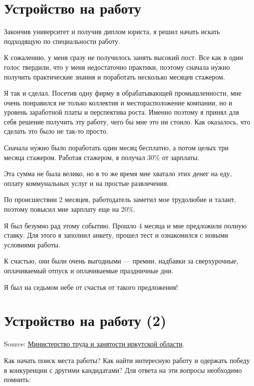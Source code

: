 
\section{Устройство на работу}
Закончив университет и получив диплом юриста, я решил начать искать подходящую по специальности работу.

К сожалению, у меня сразу не получилось занять высокий пост.
Все как в один голос твердили, что у меня недостаточно практики, поэтому сначала н\'{у}жно получить практические знания и поработать несколько месяцев стажером.

Я так и сделал.
Посетив одну фирму в обрабатывающей промышленности, мне очень понравился не только коллектив и месторасположение компании, но и уровень заработной платы и перспектива роста.
Именно поэтому я принял для себя решение получить эту работу, чего бы мне это ни стоило.
Как оказалось, что сделать это было не так-то просто.

Сначала н\'{у}жно было поработать один месяц бесплатно, а потом целых три месяца стажером.
Работая стажером, я получал 30\% от зарплаты.

Эта сумма не была велико, но в то же время мне хватало этих денег на еду, оплату коммунальных услуг и на простые развлечения.

По происшествии 2 месяцев, работодатель заметил мое трудолюбие и талант, поэтому повысил мне зарплату еще на 20\%.

Я был безумно рад этому событию. Прошло 4 месяца и мне предложили полную ставку.
Для этого я заполнил анкету, прошел тест и ознакомился с новыми условиями работы.

К счастью, они были очень выгодными --- премии, надбавки за сверхурочные, оплачиваемый отпуск и оплачиваемые праздничные дни.

Я был на седьмом небе от счастья от такого предложения!

\section{Устройство на работу (2)}
Source: \href{http://irkzan.ru/home/gragd/soiskatel/soiskatelrabota.aspx}{Министерство труда и занятости иркутской области}.

Как начать поиск  места работы? Как найти интересную работу и одержать победу в конкуренции с другими кандидатами? Для ответа на эти вопросы необходимо помнить:

